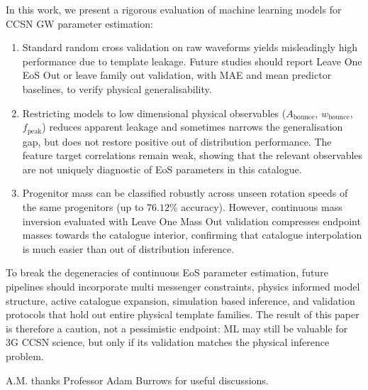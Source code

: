 \documentclass[reprint,aps,prd,floatfix,nofootinbib,superscriptaddress,showpacs]{revtex4-2}
\begin{document}
In this work, we present a rigorous evaluation of machine learning models for CCSN GW parameter estimation:
\begin{enumerate}
    \item Standard random cross validation on raw waveforms yields misleadingly high performance due to template leakage. Future studies should report Leave One EoS Out or leave family out validation, with MAE and mean predictor baselines, to verify physical generalisability.
    \item Restricting models to low dimensional physical observables ($A_{\text{bounce}}$, $w_{\text{bounce}}$, $f_{\text{peak}}$) reduces apparent leakage and sometimes narrows the generalisation gap, but does not restore positive out of distribution performance. The feature target correlations remain weak, showing that the relevant observables are not uniquely diagnostic of EoS parameters in this catalogue.
    \item Progenitor mass can be classified robustly across unseen rotation speeds of the same progenitors (up to $76.12\%$ accuracy). However, continuous mass inversion evaluated with Leave One Mass Out validation compresses endpoint masses towards the catalogue interior, confirming that catalogue interpolation is much easier than out of distribution inference.
\end{enumerate}

To break the degeneracies of continuous EoS parameter estimation, future pipelines should incorporate multi messenger constraints, physics informed model structure, active catalogue expansion, simulation based inference, and validation protocols that hold out entire physical template families. The result of this paper is therefore a caution, not a pessimistic endpoint: ML may still be valuable for 3G CCSN science, but only if its validation matches the physical inference problem.

\begin{acknowledgments}
A.M. thanks Professor Adam Burrows for useful discussions.
\end{acknowledgments}
\end{document}
